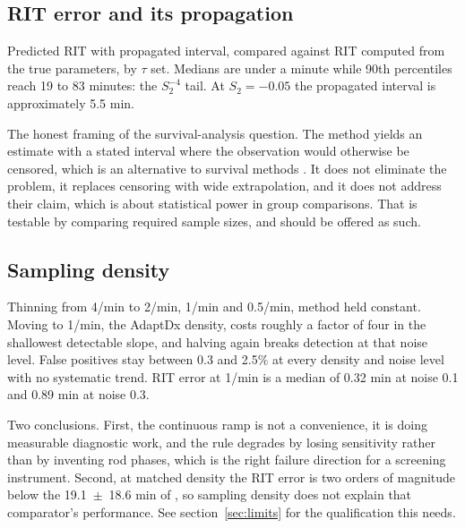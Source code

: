 \documentclass[11pt,a4paper]{article}
\newcommand{\Sii}{S_2}
\begin{document}
\subsection{RIT error and its propagation}
\begin{evidence}
Predicted RIT with propagated interval, compared against RIT computed from
the true parameters, by $\tau$ set. Medians are under a minute while 90th
percentiles reach 19 to 83 minutes: the $\Sii^{-4}$ tail. At
$\Sii = -0.05$ the propagated interval is approximately 5.5 min.
\end{evidence}
\begin{towrite}
The honest framing of the survival-analysis question. The method yields an
estimate with a stated interval where the observation would otherwise be
censored, which is an alternative to survival methods
\citep{Higgins:2018aa}. It does not eliminate the problem, it replaces
censoring with wide extrapolation, and it does not address their claim,
which is about statistical power in group comparisons. That is testable by
comparing required sample sizes, and should be offered as such.
\end{towrite}

\subsection{Sampling density}
\begin{evidence}
Thinning from 4/min to 2/min, 1/min and 0.5/min, method held constant.
Moving to 1/min, the AdaptDx density, costs roughly a factor of four in the
shallowest detectable slope, and halving again breaks detection at that
noise level. False positives stay between 0.3 and 2.5\% at every density and
noise level with no systematic trend. RIT error at 1/min is a median of
0.32 min at noise 0.1 and 0.89 min at noise 0.3.
\end{evidence}
\begin{towrite}
Two conclusions. First, the continuous ramp is not a convenience, it is
doing measurable diagnostic work, and the rule degrades by losing
sensitivity rather than by inventing rod phases, which is the right failure
direction for a screening instrument. Second, at matched density the RIT
error is two orders of magnitude below the 19.1~$\pm$~18.6 min of
\citet{DeSilva:2019aa}, so sampling density does not explain that
comparator's performance. See section~\ref{sec:limits} for the qualification
this needs.
\end{towrite}
\end{document}
